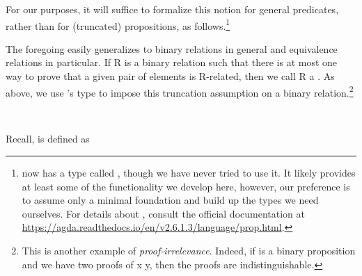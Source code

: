 For our purposes, it will suffice to formalize this notion for general predicates, rather than for (truncated) propositions, as follows.\footnote{\agda now has a type called \proptype, though we have never tried to use it. It likely provides at least some of the functionality we develop here, however, our preference is to assume only a minimal \mltt foundation and build up the types we need ourselves. For details about \proptype, consult the official documentation at \url{https://agda.readthedocs.io/en/v2.6.1.3/language/prop.html}.}
\ccpad
\begin{code}%
\end{code}
\scpad
\begin{code}
\end{code}
\ccpad
The foregoing easily generalizes to binary relations in general and equivalence
relations in particular.  If \ab R is a binary relation such that there is at
most one way to prove that a given pair of elements is \ab R-related, then we call
\ab R a . As above, we use \typtop's
 type to impose this truncation assumption on a
binary relation.\footnote{%
This is another example of \emph{proof-irrelevance}. Indeed, if  is a binary proposition and we
have two proofs of  \ab x \ab y, then the proofs are indistinguishable.}
\ccpad
\begin{code}%
\>[0]\AgdaSpace{}%
\AgdaSymbol{:}\AgdaSpace{}%
\AgdaSymbol{\{}\AgdaSpace{}%
\AgdaSymbol{:}\AgdaSpace{}%
\AgdaSymbol{\}}\AgdaSpace{}%
\AgdaSpace{}%
\AgdaSpace{}%
\AgdaSpace{}%
\AgdaSpace{}%
\AgdaSymbol{(}\AgdaSpace{}%
\AgdaSymbol{:}\AgdaSpace{}%
\AgdaSymbol{)}\AgdaSpace{}%
\AgdaSpace{}%
\AgdaSpace{}%
\AgdaSpace{}%
\AgdaSpace{}%
\AgdaSpace{}%
\<%
\\
\>[0]\AgdaSpace{}%
\AgdaSpace{}%
\AgdaSpace{}%
\AgdaSymbol{=}\AgdaSpace{}%
\AgdaSpace{}%
\AgdaSpace{}%
\AgdaSpace{}%
\AgdaSymbol{(}\AgdaSpace{}%
\AgdaSpace{}%
\AgdaSymbol{)}\AgdaSpace{}%
\AgdaFunction{,}\AgdaSpace{}%
\AgdaSpace{}%
\<%
\end{code}
\ccpad
Recall,  is defined as\\[-10pt]


